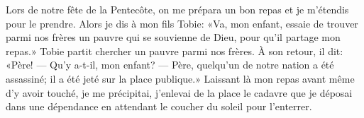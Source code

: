 Lors de notre fête de la Pentecôte,
	on me prépara un bon repas et je m’étendis pour le prendre.
Alors je dis à mon fils Tobie: «Va, mon enfant,
	essaie de trouver parmi nos frères un pauvre qui se souvienne de Dieu,
	pour qu’il partage mon repas.»
Tobie partit chercher un pauvre parmi nos frères.
À son retour, il dit: «Père!
		--- Qu’y a-t-il, mon enfant? ---
Père, quelqu’un de notre nation a été assassiné; il a été jeté sur la place publique.»
Laissant là mon repas avant même d’y avoir touché,
	je me précipitai, j’enlevai de la place le cadavre
	que je déposai dans une dépendance en attendant le coucher du soleil pour l’enterrer.
